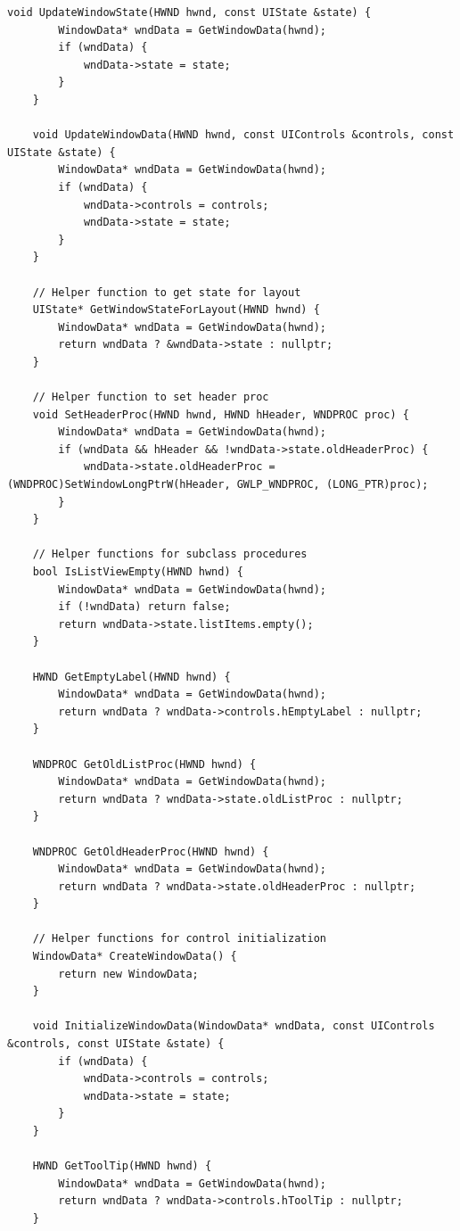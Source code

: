 \begin{lstlisting}[style=CodeListing]
    void UpdateWindowState(HWND hwnd, const UIState &state) {
        WindowData* wndData = GetWindowData(hwnd);
        if (wndData) {
            wndData->state = state;
        }
    }
    
    void UpdateWindowData(HWND hwnd, const UIControls &controls, const UIState &state) {
        WindowData* wndData = GetWindowData(hwnd);
        if (wndData) {
            wndData->controls = controls;
            wndData->state = state;
        }
    }
    
    // Helper function to get state for layout
    UIState* GetWindowStateForLayout(HWND hwnd) {
        WindowData* wndData = GetWindowData(hwnd);
        return wndData ? &wndData->state : nullptr;
    }
    
    // Helper function to set header proc
    void SetHeaderProc(HWND hwnd, HWND hHeader, WNDPROC proc) {
        WindowData* wndData = GetWindowData(hwnd);
        if (wndData && hHeader && !wndData->state.oldHeaderProc) {
            wndData->state.oldHeaderProc = (WNDPROC)SetWindowLongPtrW(hHeader, GWLP_WNDPROC, (LONG_PTR)proc);
        }
    }
    
    // Helper functions for subclass procedures
    bool IsListViewEmpty(HWND hwnd) {
        WindowData* wndData = GetWindowData(hwnd);
        if (!wndData) return false;
        return wndData->state.listItems.empty();
    }
    
    HWND GetEmptyLabel(HWND hwnd) {
        WindowData* wndData = GetWindowData(hwnd);
        return wndData ? wndData->controls.hEmptyLabel : nullptr;
    }
    
    WNDPROC GetOldListProc(HWND hwnd) {
        WindowData* wndData = GetWindowData(hwnd);
        return wndData ? wndData->state.oldListProc : nullptr;
    }
    
    WNDPROC GetOldHeaderProc(HWND hwnd) {
        WindowData* wndData = GetWindowData(hwnd);
        return wndData ? wndData->state.oldHeaderProc : nullptr;
    }
    
    // Helper functions for control initialization
    WindowData* CreateWindowData() {
        return new WindowData;
    }
    
    void InitializeWindowData(WindowData* wndData, const UIControls &controls, const UIState &state) {
        if (wndData) {
            wndData->controls = controls;
            wndData->state = state;
        }
    }
    
    HWND GetToolTip(HWND hwnd) {
        WindowData* wndData = GetWindowData(hwnd);
        return wndData ? wndData->controls.hToolTip : nullptr;
    }
    

\end{lstlisting}
